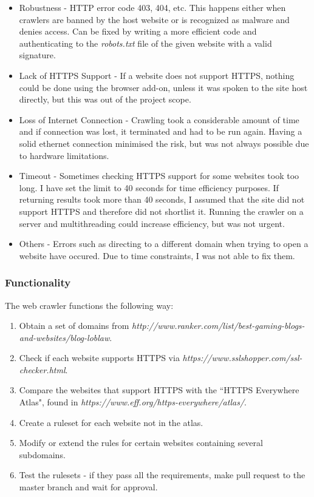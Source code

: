 \documentclass[a4paper, 12pt, titlepage]{article}
\begin{document}
\begin{itemize}
\item{Robustness - HTTP error code 403, 404, etc. This happens either when crawlers are banned by the host website or is recognized as malware and denies access. Can be fixed by writing a more efficient code and authenticating to the \textit{robots.txt} file of the given website with a valid signature.}
\item{Lack of HTTPS Support - If a website does not support HTTPS, nothing could be done using the browser add-on, unless it was spoken to the site host directly, but this was out of the project scope.}
\item{Loss of Internet Connection - Crawling took a considerable amount of time and if connection was lost, it terminated and had to be run again. Having a solid ethernet connection minimised the risk, but was not always possible due to hardware limitations.}
\item{Timeout - Sometimes checking HTTPS support for some websites took too long. I have set the limit to 40 seconds for time efficiency purposes. If returning results took more than 40 seconds, I assumed that the site did not support HTTPS and therefore did not shortlist it. Running the crawler on a server and multithreading could increase efficiency, but was not urgent.}
\item{Others - Errors such as directing to a different domain when trying to open a website have occured. Due to time constraints, I was not able to fix them.}
\end{itemize}

\subsubsection{Functionality}
The web crawler functions the following way:

\begin{enumerate}
\item{Obtain a set of domains from \textit{http://www.ranker.com/list/best-gaming-blogs-and-websites/blog-loblaw}.}
\item{Check if each website supports HTTPS via \textit{https://www.sslshopper.com/ssl-checker.html}.}
\item{Compare the websites that support HTTPS with the ``HTTPS Everywhere Atlas", found in \textit{https://www.eff.org/https-everywhere/atlas/}.}
\item{Create a ruleset for each website not in the atlas.}
\item{Modify or extend the rules for certain websites containing several subdomains.}
\item{Test the rulesets - if they pass all the requirements, make pull request to the master branch and wait for approval.}
\end{enumerate}
\end{document}
